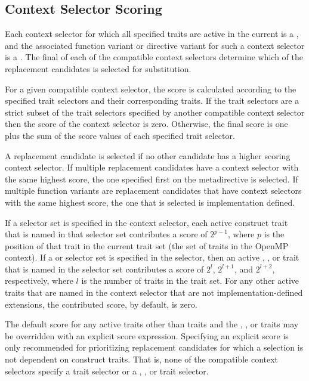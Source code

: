 \subsection{Context Selector Scoring}

\label{subsec:context_selector_scoring}

Each context selector for which all specified traits are active in the current
 is a , and the associated
function variant or directive variant for such a context selector is a
. The final  of each of the compatible
context selectors determine which of the replacement candidates is selected for
substitution. 

For a given compatible context selector, the score is calculated according
to the specified trait selectors and their corresponding traits. If the trait
selectors are a strict subset of the trait selectors specified by another
compatible context selector then the score of the context selector is zero.
Otherwise, the final score is one plus the sum of the score values of each
specified trait selector.

A replacement candidate is selected if no other candidate has a higher scoring
context selector. If multiple replacement candidates have a context selector
with the same highest score, the one specified first on the metadirective is
selected. If multiple function variants are replacement candidates that have
context selectors with the same highest score, the one that is selected is
implementation defined.

If a  selector set is specified in the context selector, each
active construct trait that is named in that selector set contributes a score
of $2^{p-1}$, where $p$ is the position of that trait in the current
 trait set (the set of traits in the OpenMP context). If a
 or  selector set is specified in the
selector, then an active , , or  trait that is
named in the selector set contributes a score of $2^l$, $2^{l+1}$, and
$2^{l+2}$, respectively, where $l$ is the number of traits in the
 trait set. For any other active traits that are named in the
context selector that are not implementation-defined extensions, the
contributed score, by default, is zero. 

The default score for any active traits other than  traits and 
the , , or  traits may be overridden with an
explicit score expression. Specifying an explicit score is only recommended
for prioritizing replacement candidates for which a selection is not 
dependent on construct traits. That is, none of the compatible context
selectors specify a  trait selector or a ,
, or  trait selector. 


